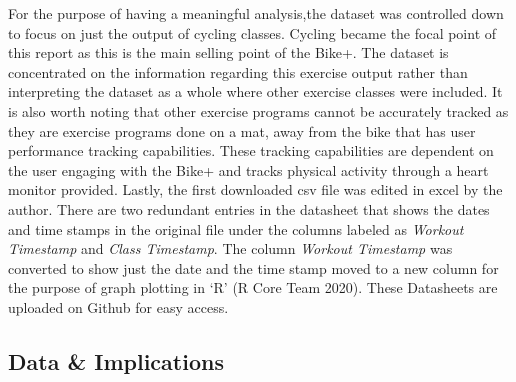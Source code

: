 \documentclass[
]{article}
\begin{document}
For the purpose of having a meaningful analysis,the dataset was controlled down to focus on just the output of cycling classes. Cycling became the focal point of this report as this is the main selling point of the Bike+. The dataset is concentrated on the information regarding this exercise output rather than interpreting the dataset as a whole where other exercise classes were included. It is also worth noting that other exercise programs cannot be accurately tracked as they are exercise programs done on a mat, away from the bike that has user performance tracking capabilities. These tracking capabilities are dependent on the user engaging with the Bike+ and tracks physical activity through a heart monitor provided. Lastly, the first downloaded csv file was edited in excel by the author. There are two redundant entries in the datasheet that shows the dates and time stamps in the original file under the columns labeled as \emph{Workout Timestamp} and \emph{Class Timestamp}. The column \emph{Workout Timestamp} was converted to show just the date and the time stamp moved to a new column for the purpose of graph plotting in `R' (R Core Team 2020). These Datasheets are uploaded on Github for easy access.

\hypertarget{data-implications}{%
\subsection{Data \& Implications}\label{data-implications}}
\end{document}
